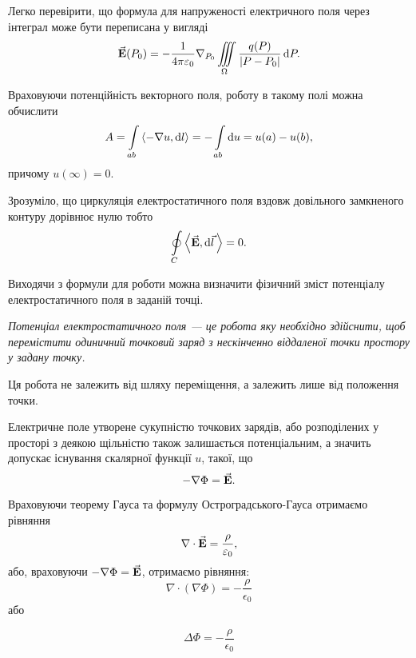 Легко перевірити, що формула для напруженості електричного поля через інтеграл може бути переписана у вигляді
\begin{equation}
	{\vec{\mathbf{E}}} (P_0) = - \frac{1}{4 \pi \varepsilon_0} \nabla_{P_0} \displaystyle\iiint\limits_\Omega \frac{q(P)}{|P-P_0|} \mathop{}\!\mathrm{d} P.
\end{equation}

Враховуючи потенційність векторного поля, роботу в такому полі можна обчислити
\begin{equation}
	A = \Int_{ab} \langle - \nabla u, \diff l \rangle = - \Int_{ab} \diff u = u(a) - u(b),
\end{equation}
причому $u(\infty) = 0$. \medskip

\begin{remark}
	Зрозуміло, що циркуляція електростатичного поля вздовж довільного замкненого контуру дорівнює нулю тобто
	\begin{equation}
		\Oint_C \langle \vecf E, \diff \vec l \, \rangle = 0.
	\end{equation}
\end{remark}

Виходячи з формули для роботи можна визначити фізичний зміст потенціалу електростатичного поля в заданій точці. 

\begin{definition}
	\it{Потенціал електростатичного поля} --- це робота яку необхідно здійснити, щоб перемістити одиничний точковий заряд з нескінченно віддаленої точки простору у задану точку.
\end{definition}

\begin{remark}
	Ця робота не залежить від шляху переміщення, а залежить лише від положення точки.
\end{remark}
	 
Електричне поле утворене сукупністю точкових зарядів, або розподілених у просторі з деякою щільністю також залишається потенціальним, а значить допускає існування скалярної функції $u$, такої, що
\begin{equation}
	-\nabla \Phi = {\vec{\mathbf{E}}}.
\end{equation}

Враховуючи теорему Гауса та формулу Остроградського-Гауса отримаємо рівняння
\begin{equation}
	\nabla \cdot {\vec{\mathbf{E}}} = \frac{\rho}{\varepsilon_0},
\end{equation}
або, враховуючи $-\nabla \Phi = {\vec{\mathbf{E}}}$, отримаємо рівняння:
\begin{equation}
	\nabla \cdot (\nabla \Phi) = -\frac{\rho}{\epsilon_0}
\end{equation}
або
\begin{th_equation}
	\begin{equation}
		\Delta \Phi = - \frac{\rho}{\epsilon_0}
	\end{equation}
\end{th_equation}

